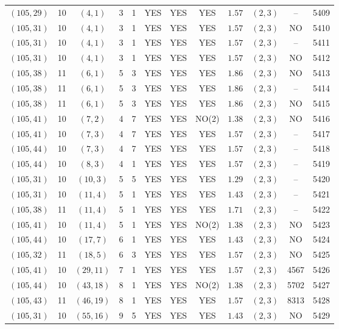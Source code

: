 \begin{longtable}{|c|c|c|c|c|c|c|c|c|c|c|c|}
$(105,29)$ & 10 & $(4,1)$ & 3 & 1 & YES & YES & YES & $1.57$ & $(2,3)$ & -- & 5409\\
$(105,31)$ & 10 & $(4,1)$ & 3 & 1 & YES & YES & YES & $1.57$ & $(2,3)$ & NO & 5410\\
$(105,31)$ & 10 & $(4,1)$ & 3 & 1 & YES & YES & YES & $1.57$ & $(2,3)$ & -- & 5411\\
$(105,31)$ & 10 & $(4,1)$ & 3 & 1 & YES & YES & YES & $1.57$ & $(2,3)$ & NO & 5412\\
$(105,38)$ & 11 & $(6,1)$ & 5 & 3 & YES & YES & YES & $1.86$ & $(2,3)$ & NO & 5413\\
$(105,38)$ & 11 & $(6,1)$ & 5 & 3 & YES & YES & YES & $1.86$ & $(2,3)$ & -- & 5414\\
$(105,38)$ & 11 & $(6,1)$ & 5 & 3 & YES & YES & YES & $1.86$ & $(2,3)$ & NO & 5415\\
$(105,41)$ & 10 & $(7,2)$ & 4 & 7 & YES & YES & NO(2) & $1.38$ & $(2,3)$ & NO & 5416\\
$(105,41)$ & 10 & $(7,3)$ & 4 & 7 & YES & YES & YES & $1.57$ & $(2,3)$ & -- & 5417\\
$(105,44)$ & 10 & $(7,3)$ & 4 & 7 & YES & YES & YES & $1.57$ & $(2,3)$ & -- & 5418\\
$(105,44)$ & 10 & $(8,3)$ & 4 & 1 & YES & YES & YES & $1.57$ & $(2,3)$ & -- & 5419\\
$(105,31)$ & 10 & $(10,3)$ & 5 & 5 & YES & YES & YES & $1.29$ & $(2,3)$ & -- & 5420\\
$(105,31)$ & 10 & $(11,4)$ & 5 & 1 & YES & YES & YES & $1.43$ & $(2,3)$ & -- & 5421\\
$(105,38)$ & 11 & $(11,4)$ & 5 & 1 & YES & YES & YES & $1.71$ & $(2,3)$ & -- & 5422\\
$(105,41)$ & 10 & $(11,4)$ & 5 & 1 & YES & YES & NO(2) & $1.38$ & $(2,3)$ & NO & 5423\\
$(105,44)$ & 10 & $(17,7)$ & 6 & 1 & YES & YES & YES & $1.43$ & $(2,3)$ & NO & 5424\\
$(105,32)$ & 11 & $(18,5)$ & 6 & 3 & YES & YES & YES & $1.57$ & $(2,3)$ & NO & 5425\\
$(105,41)$ & 10 & $(29,11)$ & 7 & 1 & YES & YES & YES & $1.57$ & $(2,3)$ & 4567 & 5426\\
$(105,44)$ & 10 & $(43,18)$ & 8 & 1 & YES & YES & NO(2) & $1.38$ & $(2,3)$ & 5702 & 5427\\
$(105,43)$ & 11 & $(46,19)$ & 8 & 1 & YES & YES & YES & $1.57$ & $(2,3)$ & 8313 & 5428\\
$(105,31)$ & 10 & $(55,16)$ & 9 & 5 & YES & YES & YES & $1.43$ & $(2,3)$ & NO & 5429\\

\end{longtable}
